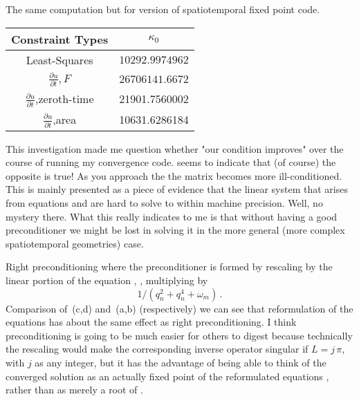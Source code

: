 \begin{description}
{The same computation but for  version of spatiotemporal fixed point code.
\begin{table}
\centering
\begin{tabular}{c|c}
Constraint Types & $\kappa_0$   \\
\hline
Least-Squares  & $10292.9974962$ \\
$\frac{\partial u}{\partial t},F$  & $26706141.6672$ \\
$\frac{\partial u}{\partial t}$,zeroth-time &  21901.7560002\\
$\frac{\partial u}{\partial t}$,area &  10631.6286184\\
\hline
\end{tabular}
\end{table}

This investigation made me question whether "our condition improves" over
the course of running my convergence code.  seems to
indicate that (of course) the opposite is true! As you approach the {\twot} the matrix becomes more ill-conditioned. This is mainly
presented as a piece of evidence that the linear system that arises from equations
and  are
hard to solve to within machine precision. Well, no mystery there. What this really indicates to me is that
without having a good preconditioner we might be lost in solving it in the more general (more complex spatiotemporal geometries) case.

Right preconditioning where the preconditioner is formed by rescaling by the
linear portion of the equation
, %
\ie, multiplying by
\[
{1}/{(q_n^2+q_n^4+\omega_m)}
\,.
\]
Comparison of
\,(c,d) and \,(a,b)
(respectively) we can see that reformulation of the equations has about the
same effect as right preconditioning. I think preconditioning is going to be
much easier for others to digest because technically the rescaling would make
the corresponding inverse operator singular if $L = j\,\pi $, with $j$ as any
integer, but it has the advantage of being able to think of the converged
solution as an actually fixed point of the reformulated equations
, rather than as merely a root of
. %
}

\end{description}
